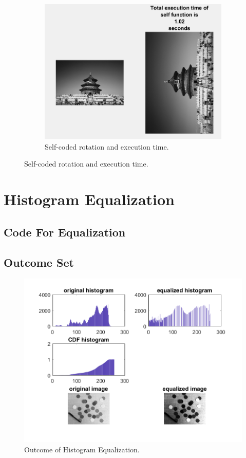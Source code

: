 \documentclass[14pt]{article}
\begin{document}
	\newpage
	\begin{figure}[hbt!]
		\centering
		\begin{subfigure}[c]{0.92\linewidth}
		\includegraphics[width=\linewidth]{selfRot.png}
		\caption{Self-coded rotation and execution time.}
		\end{subfigure}
	\end{figure}

	\section{Histogram Equalization}
	\subsection{Code For Equalization}
	
	\subsection{Outcome Set }
	\begin{figure}[hbt!]
		\centering
			\includegraphics[width=\linewidth]{eq.png}
			\caption{Outcome of Histogram Equalization.}
	\end{figure}
\end{document}
